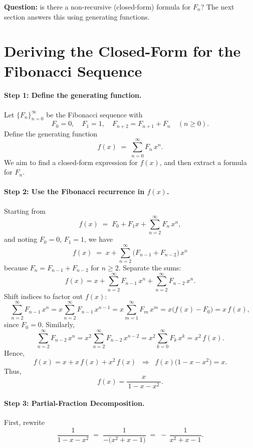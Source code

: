 \documentclass[docmute]{article}
\begin{document}
\medskip
\noindent\textbf{Question:} is there a non-recursive (closed-form) formula for \(F_n\)?  The next section answers this using generating functions.

\section{Deriving the Closed-Form for the Fibonacci Sequence}

\paragraph{Step 1: Define the generating function.}
Let \(\{F_n\}_{n=0}^{\infty}\) be the Fibonacci sequence with 
\[
F_0 = 0, \quad F_1 = 1, \quad F_{n+2} = F_{n+1} + F_n \quad (n \ge 0).
\]
Define the generating function
\[
f(x) \;=\; \sum_{n=0}^{\infty} F_n\,x^n.
\]
We aim to find a closed-form expression for \(f(x)\), and then extract a formula for \(F_n\).

\paragraph{Step 2: Use the Fibonacci recurrence in \(f(x)\).}
Starting from
\[
f(x) \;=\; F_0 + F_1 x + \sum_{n=2}^{\infty} F_n\,x^n,
\]
and noting \(F_0=0\), \(F_1=1\), we have
\[
f(x) \;=\; x + \sum_{n=2}^{\infty} \bigl(F_{n-1} + F_{n-2}\bigr)\,x^n
\]
because \(F_n = F_{n-1} + F_{n-2}\) for \(n\ge2\). Separate the sums:
\[
f(x)
= x
+ \sum_{n=2}^{\infty} F_{n-1}\,x^n
+ \sum_{n=2}^{\infty} F_{n-2}\,x^n.
\]
Shift indices to factor out \(f(x)\):
\[
\sum_{n=2}^{\infty} F_{n-1}\,x^n 
= x \sum_{n=2}^{\infty} F_{n-1}\,x^{n-1} 
= x \sum_{m=1}^{\infty} F_m\,x^m 
= x \bigl(f(x) - F_0\bigr) 
= x\,f(x),
\]
since \(F_0=0\). Similarly,
\[
\sum_{n=2}^{\infty} F_{n-2}\,x^n 
= x^2 \sum_{n=2}^{\infty} F_{n-2}\,x^{n-2}
= x^2 \sum_{k=0}^{\infty} F_k\,x^k
= x^2\,f(x).
\]
Hence,
\[
f(x) = x + x\,f(x) + x^2\,f(x) 
\;\;\Longrightarrow\;\;
f(x)\bigl(1 - x - x^2\bigr) = x.
\]
Thus,
\[
f(x) = \frac{x}{\,1 - x - x^2\,}.
\]

\paragraph{Step 3: Partial-Fraction Decomposition.}

First, rewrite
\[
\frac{1}{1 - x - x^2}
\;=\;
\frac{1}{-\bigl(x^2 + x - 1\bigr)}
\;=\;
-\,\frac{1}{x^2 + x - 1}.
\]
\end{document}

